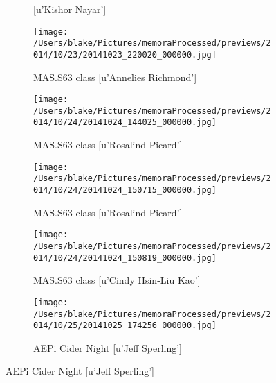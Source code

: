 \documentclass{article}
\begin{document}
\begin{figure}
\begin{subfigure}{.25\textwidth}
{[u'Kishor Nayar']}\end{subfigure}
\begin{subfigure}{.25\textwidth}\centering\texttt{[image: /Users/blake/Pictures/memoraProcessed/previews/2014/10/23/20141023\_220020\_000000.jpg]}\caption{MAS.S63 class
[u'Annelies Richmond']}\end{subfigure}
\begin{subfigure}{.25\textwidth}\centering\texttt{[image: /Users/blake/Pictures/memoraProcessed/previews/2014/10/24/20141024\_144025\_000000.jpg]}\caption{MAS.S63 class
[u'Rosalind Picard']}\end{subfigure}
\begin{subfigure}{.25\textwidth}\centering\texttt{[image: /Users/blake/Pictures/memoraProcessed/previews/2014/10/24/20141024\_150715\_000000.jpg]}\caption{MAS.S63 class
[u'Rosalind Picard']}\end{subfigure}
\begin{subfigure}{.25\textwidth}\centering\texttt{[image: /Users/blake/Pictures/memoraProcessed/previews/2014/10/24/20141024\_150819\_000000.jpg]}\caption{MAS.S63 class
[u'Cindy Hsin-Liu Kao']}\end{subfigure}


\begin{subfigure}{.25\textwidth}\centering\texttt{[image: /Users/blake/Pictures/memoraProcessed/previews/2014/10/25/20141025\_174256\_000000.jpg]}\caption{AEPi Cider Night
[u'Jeff Sperling']}\end{subfigure}



\end{figure}
\end{document}
